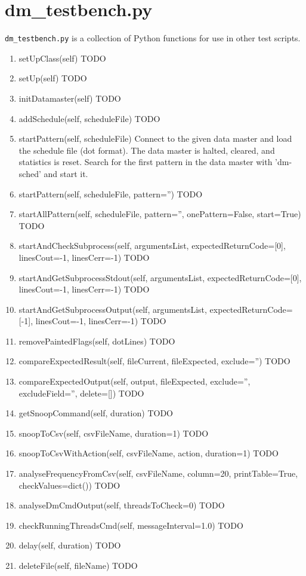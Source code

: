 \documentclass[12pt,a4paper]{report}
\begin{document}
\section{dm\_testbench.py}
\texttt{dm\_testbench.py} is a collection of Python functions for use in other test scripts.
\begin{enumerate}
\item setUpClass(self)
TODO
\item setUp(self)
TODO
\item initDatamaster(self)
TODO
\item addSchedule(self, scheduleFile)
TODO
\item startPattern(self, scheduleFile)
    Connect to the given data master and load the schedule file (dot format).
    The data master is halted, cleared, and statistics is reset.
    Search for the first pattern in the data master with 'dm-sched' and start it.
\item startPattern(self, scheduleFile, pattern='')
TODO
\item startAllPattern(self, scheduleFile, pattern='', onePattern=False, start=True)
TODO
\item startAndCheckSubprocess(self, argumentsList, expectedReturnCode=[0], linesCout=-1, linesCerr=-1)
TODO
\item startAndGetSubprocessStdout(self, argumentsList, expectedReturnCode=[0], linesCout=-1, linesCerr=-1)
TODO
\item startAndGetSubprocessOutput(self, argumentsList, expectedReturnCode=[-1], linesCout=-1, linesCerr=-1)
TODO
\item removePaintedFlags(self, dotLines)
TODO
\item compareExpectedResult(self, fileCurrent, fileExpected, exclude='')
TODO
\item compareExpectedOutput(self, output, fileExpected, exclude='', excludeField='', delete=[])
TODO
\item getSnoopCommand(self, duration)
TODO
\item snoopToCsv(self, csvFileName, duration=1)
TODO
\item snoopToCsvWithAction(self, csvFileName, action, duration=1)
TODO
\item analyseFrequencyFromCsv(self, csvFileName, column=20, printTable=True, checkValues=dict())
TODO
\item analyseDmCmdOutput(self, threadsToCheck=0)
TODO
\item checkRunningThreadsCmd(self, messageInterval=1.0)
TODO
\item delay(self, duration)
TODO
\item deleteFile(self, fileName)
TODO
\end{enumerate}
\end{document}
